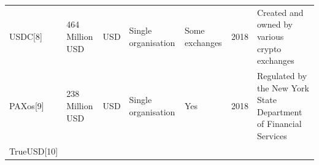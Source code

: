 \documentclass[english,]{IEEEtran}
\begin{document}
\begin{longtable}[]{@{}lllllll@{}}
\begin{minipage}[t]{0.14\columnwidth}
USDC{[}8{]}\strut
\end{minipage} & \begin{minipage}[t]{0.08\columnwidth}\raggedright\strut
464 Million USD\strut
\end{minipage} & \begin{minipage}[t]{0.08\columnwidth}\raggedright\strut
USD\strut
\end{minipage} & \begin{minipage}[t]{0.10\columnwidth}\raggedright\strut
Single organisation\strut
\end{minipage} & \begin{minipage}[t]{0.08\columnwidth}\raggedright\strut
Some exchanges\strut
\end{minipage} & \begin{minipage}[t]{0.04\columnwidth}\raggedright\strut
2018\strut
\end{minipage} & \begin{minipage}[t]{0.30\columnwidth}\raggedright\strut
Created and owned by various crypto exchanges\strut
\end{minipage}\tabularnewline
\begin{minipage}[t]{0.14\columnwidth}\raggedright\strut
PAXos{[}9{]}\strut
\end{minipage} & \begin{minipage}[t]{0.08\columnwidth}\raggedright\strut
238 Million USD\strut
\end{minipage} & \begin{minipage}[t]{0.08\columnwidth}\raggedright\strut
USD\strut
\end{minipage} & \begin{minipage}[t]{0.10\columnwidth}\raggedright\strut
Single organisation\strut
\end{minipage} & \begin{minipage}[t]{0.08\columnwidth}\raggedright\strut
Yes\strut
\end{minipage} & \begin{minipage}[t]{0.04\columnwidth}\raggedright\strut
2018\strut
\end{minipage} & \begin{minipage}[t]{0.30\columnwidth}\raggedright\strut
Regulated by the New York State Department of Financial Services\strut
\end{minipage}\tabularnewline
\begin{minipage}[t]{0.14\columnwidth}\raggedright\strut
TrueUSD{[}10{]}\strut
\end{minipage} & \begin{minipage}[t]{0.08\columnwidth}\raggedright\strut

\end{minipage}
\end{longtable}
\end{document}
